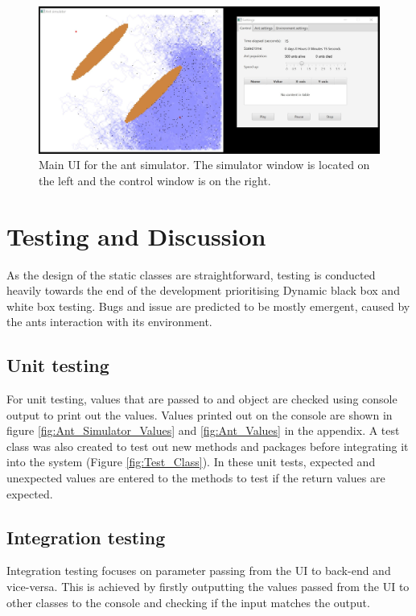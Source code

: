 \documentclass[a4paper, oneside, 11pt]{report}
\begin{document}
\begin{figure}[htb]
	\begin{center}
		\includegraphics[width=1.0 \columnwidth]{Main_Simulator.jpg}
		\caption{Main UI for the ant simulator. The simulator window is located on the left and the control window is on the right.}
		\label{fig:Main_Simulator}
	\end{center}
\end{figure}


\chapter{Testing and Discussion}
\label{chap:Testing}
As the design of the static classes are straightforward, testing is conducted heavily towards the end of the development prioritising Dynamic black box and white box testing. Bugs and issue are predicted to be mostly emergent, caused by the ants interaction with its environment.

\section{Unit testing}
For unit testing, values that are passed to and object are checked using console output to print out the values. Values printed out on the console are shown in figure \ref{fig:Ant_Simulator_Values} and \ref{fig:Ant_Values} in the appendix. A test class was also created to test out  new methods and packages before integrating it into the system (Figure \ref{fig:Test_Class}). In these unit tests, expected and unexpected values are entered to the methods to test if the return values are expected.

\section{Integration testing}
Integration testing focuses on parameter passing from the UI to back-end and vice-versa. This is achieved by firstly outputting the values passed from the UI to other classes to the console and checking if the input matches the output.
\end{document}
